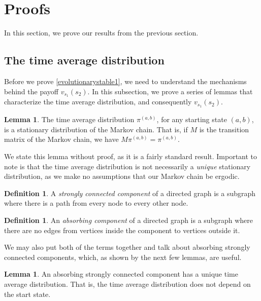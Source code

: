 \documentclass[11pt]{amsart}
\theoremstyle{definition}
\newtheorem{definition}[theorem]{Definition}
\newtheorem{lemma}[theorem]{Lemma}
\theoremstyle{remark}
\begin{document}
\section{Proofs}
\label{sectionproofs}

In this section, we prove our results from the previous section.

\subsection{The time average distribution}

Before we prove \cref{evolutionarystable1}, we need to understand the mechanisms behind the payoff $v_{s_1}(s_2)$. In this subsection, we prove a series of lemmas that characterize the time average distribution, and consequently $v_{s_1}(s_2)$.

\begin{lemma}
  \label{timeaverageisstationary}
  The time average distribution $\pi^{(a,b)}$, for any starting state $(a,b)$, is a stationary distribution of the Markov chain. That is, if $M$ is the transition matrix of the Markov chain, we have $M \pi^{(a,b)} = \pi^{(a,b)}$.
\end{lemma}

We state this lemma without proof, as it is a fairly standard result. Important to note is that the time average distribution is not necessarily a \textit{unique} stationary distribution, as we make no assumptions that our Markov chain be ergodic.

\begin{definition}
  A \textit{strongly connected component} of a directed graph is a subgraph where there is a path from every node to every other node.
\end{definition}

\begin{definition}
  An \textit{absorbing component} of a directed graph is a subgraph where there are no edges from vertices inside the component to vertices outside it.
\end{definition}

We may also put both of the terms together and talk about absorbing strongly connected components, which, as shown by the next few lemmas, are useful.

\begin{lemma}
  \label{lemmaabsorbinghasuniquetimeaverage}
  An absorbing strongly connected component has a unique time average distribution. That is, the time average distribution does not depend on the start state.
\end{lemma}
\end{document}
